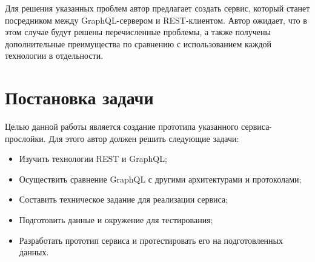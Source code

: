 Для решения указанных проблем автор предлагает создать сервис, который станет посредником между GraphQL-сервером и REST-клиентом.
Автор ожидает, что в этом случае будут решены перечисленные проблемы, а также получены дополнительные преимущества по сравнению с использованием каждой технологии в отдельности.

\section{Постановка задачи}\label{intro:tasks}

Целью данной работы является создание прототипа указанного сервиса-прослойки.
Для этого автор должен решить следующие задачи:
\begin{itemize}
	\item Изучить технологии REST и GraphQL;
	\item Осуществить сравнение GraphQL с другими архитектурами и протоколами;
	\item Составить техническое задание для реализации сервиса;
	\item Подготовить данные и окружение для тестирования;
	\item Разработать прототип сервиса и протестировать его на подготовленных данных.
\end{itemize}

